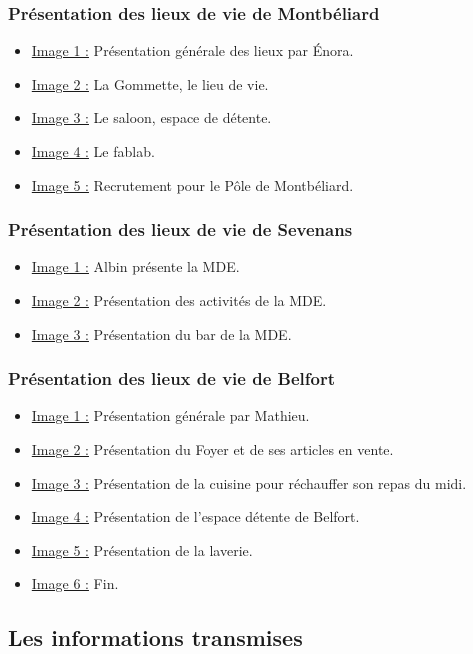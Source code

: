 \subsubsection{Présentation des lieux de vie de Montbéliard}
\begin{itemize}
    \item \underline{Image 1 :} Présentation générale des lieux par Énora.
    \item \underline{Image 2 :} La Gommette, le lieu de vie.
    \item \underline{Image 3 :} Le saloon, espace de détente.
    \item \underline{Image 4 :} Le fablab.
    \item \underline{Image 5 :} Recrutement pour le Pôle de Montbéliard.
\end{itemize}

\subsubsection{Présentation des lieux de vie de Sevenans}
\begin{itemize}
    \item \underline{Image 1 :} Albin présente la MDE.
    \item \underline{Image 2 :} Présentation des activités de la MDE.
    \item \underline{Image 3 :} Présentation du bar de la MDE.
\end{itemize}

\subsubsection{Présentation des lieux de vie de Belfort}
\begin{itemize}
    \item \underline{Image 1 :} Présentation générale par Mathieu.
    \item \underline{Image 2 :} Présentation du Foyer et de ses articles en vente.
    \item \underline{Image 3 :} Présentation de la cuisine pour réchauffer son repas du midi.
    \item \underline{Image 4 :} Présentation de l'espace détente de Belfort.
    \item \underline{Image 5 :} Présentation de la laverie.
    \item \underline{Image 6 :} Fin.
\end{itemize}

\subsection{Les informations transmises}\label{subsec:les-informations-transmises}

